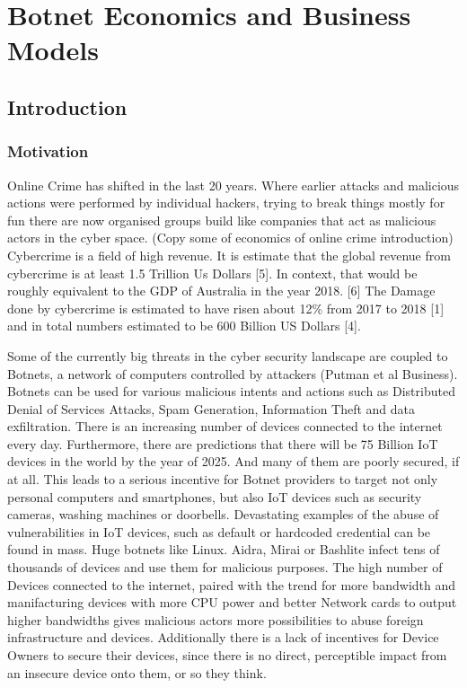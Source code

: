 \chapter{Botnet Economics and Business Models}


\newpage

\minitoc %

\newpage

\section{Introduction}

\subsection{Motivation}
Online Crime has shifted in the last 20 years. Where earlier attacks and malicious actions were performed by individual hackers, trying to break things mostly for fun there are now organised groups build like companies that act as malicious actors in the cyber space. (Copy some of economics of online crime introduction)
Cybercrime is a field of high revenue. It is estimate that the global revenue from cybercrime is at least 1.5 Trillion Us Dollars [5]. In context, that would be roughly equivalent to the GDP of Australia in the year 2018. [6]
The Damage done by cybercrime is estimated to have risen about 12\% from 2017 to 2018 [1] and in total numbers estimated to be 600 Billion US Dollars [4]. 

Some of the currently big threats in the cyber security landscape are coupled to Botnets, a network of computers controlled by attackers (Putman et al Business). Botnets can be used for various malicious intents and actions such as Distributed Denial of Services Attacks, Spam Generation, Information Theft and data exfiltration. 
There is an increasing number of devices connected to the internet every day. Furthermore, there are predictions that there will be 75 Billion IoT devices in the world by the year of 2025. 
And many of them are poorly secured, if at all. This leads to a serious incentive for Botnet providers to target not only personal computers and smartphones, but also IoT devices such as security cameras, washing machines or doorbells. Devastating examples of the abuse of vulnerabilities in IoT devices, such as default or hardcoded credential can be found in mass. Huge botnets like Linux. Aidra, Mirai or Bashlite infect tens of thousands of devices and use them for malicious purposes.   
The high number of Devices connected to the internet, paired with the trend for more bandwidth and manifacturing devices with more CPU power and better Network cards to output higher bandwidths gives malicious actors more possibilities to abuse foreign infrastructure and devices. 
Additionally there is a lack of incentives for Device Owners to secure their devices, since there is no direct, perceptible impact from an insecure device onto them, or so they think. 

